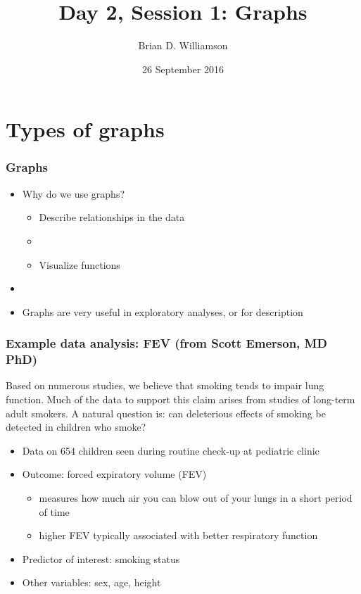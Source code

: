 \documentclass[11pt]{beamer}
\title{Day 2, Session 1: Graphs}
\author{Brian D. Williamson}
\institute{EPI/BIOST Bootcamp 2016}
\date{26 September 2016}
\newcommand{\myframe}[1]{\begin{frame} \frametitle{#1}}
\newenvironment{spaceitemize}
{ \begin{itemize}
    \setlength{\itemsep}{10pt}
    \setlength{\parskip}{0pt}
    \setlength{\parsep}{0pt}     }
{ \end{itemize}                  }
\begin{document}
\begin{frame}
\titlepage
\end{frame}

\section{Types of graphs}
\myframe{Graphs}
\begin{itemize}
\item Why do we use graphs?
\begin{itemize}
\item Describe relationships in the data
\item[]
\item Visualize functions
\end{itemize}
\item[]
\item Graphs are very useful in exploratory analyses, or for description
\end{itemize}
\end{frame}

\myframe{Example data analysis: FEV \small (from Scott Emerson, MD PhD)}
Based on numerous studies, we believe that smoking tends to impair lung function. Much of the data to support this claim arises from studies of long-term adult smokers. A natural question is: can deleterious effects of smoking be detected in children who smoke?
\begin{spaceitemize}
\item Data on 654 children seen during routine check-up at pediatric clinic
\item Outcome: forced expiratory volume (FEV)
\begin{itemize}
\item measures how much air you can blow out of your lungs in a short period of time
\item higher FEV typically associated with better respiratory function
\end{itemize}
\item Predictor of interest: smoking status
\item Other variables: sex, age, height
\end{spaceitemize}
\end{frame}
\end{document}
